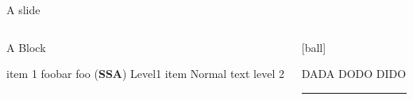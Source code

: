 \documentclass[9pt]{beamer}
\begin{document}
\begin{frame}[t]{A slide}
    \begin{columns}[T]
        \begin{column}{0.45\textwidth} 
            \begin{alertblock}{A Block}   
                \begin{outline}       
                \1 item 1 
                \1 foobar foo (\textbf{SSA})
                \1 Level1 item
                \2 Normal text level 2
                \end{outline}
            \end{alertblock}        
        \end{column}     
        \begin{column}{0.5\textwidth}
        \begin{minipage}[t][.88\textheight][c]{\textwidth}
            [ball]
            \begin{outline}
                \1 DADA
                \1 DODO
                \1 DIDO
            \end{outline}
            \begin{center}
               \rule{\textwidth}{5cm}
            \end{center}
                \end{minipage}
       \end{column}
    \end{columns}
\end{frame}
\end{document}

